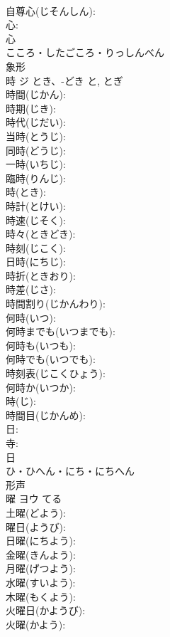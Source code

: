 \documentclass[8pt]{extreport}
\begin{document}
\begin{CJK}{UTF8}{min}
\\	自尊心(じそんしん): 
\\	心: 
\\	心	
\\	こころ・したごころ・りっしんべん	
\\	象形 
\\	時	ジ	とき、-どき	と, とぎ	
\\	時間(じかん): 
\\	時期(じき): 
\\	時代(じだい): 
\\	当時(とうじ): 
\\	同時(どうじ): 
\\	一時(いちじ): 
\\	臨時(りんじ): 
\\	時(とき): 
\\	時計(とけい): 
\\	時速(じそく): 
\\	時々(ときどき): 
\\	時刻(じこく): 
\\	日時(にちじ): 
\\	時折(ときおり): 
\\	時差(じさ): 
\\	時間割り(じかんわり): 
\\	何時(いつ): 
\\	何時までも(いつまでも): 
\\	何時も(いつも): 
\\	何時でも(いつでも): 
\\	時刻表(じこくひょう): 
\\	何時か(いつか): 
\\	時(じ): 
\\	時間目(じかんめ): 
\\	日: 
\\	寺: 
\\	日	
\\	ひ・ひへん・にち・にちへん	
\\	形声 
\\	曜	ヨウ		てる	
\\	土曜(どよう): 
\\	曜日(ようび): 
\\	日曜(にちよう): 
\\	金曜(きんよう): 
\\	月曜(げつよう): 
\\	水曜(すいよう): 
\\	木曜(もくよう): 
\\	火曜日(かようび): 
\\	火曜(かよう): 

\end{CJK}
\end{document}
